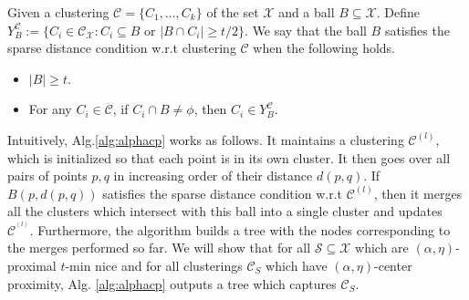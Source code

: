 \documentclass[anon,12pt]{colt2016} %
\newcommand{\mc}{\mathcal}
\begin{document}
\begin{definition}
	 Given a clustering $\mc C = \{C_1,\ldots,C_k\}$ of the set $\mc X$ and a ball $B \subseteq \mc X$. Define $Y_B^{\mc C} := \{C_i \in \mc C_{\mc X} : C_i \subseteq B \text{ or } |B \cap C_i| \ge t/2\}$. 
We say that the ball $B$ satisfies the sparse distance condition w.r.t clustering $\mc C$ when the following holds.
\begin{itemize}[noitemsep, leftmargin=*]
\item $|B| \ge t$.
\item For any $C_i \in \mc C$, if $C_i \cap B \neq \phi$, then $C_i \in Y_B^{\mc C}$.
\end{itemize}
\end{definition}

Intuitively, Alg.\ref{alg:alphacp} works as follows. It maintains a clustering $\mc C^{(l)}$, which is initialized so that each point is in its own cluster. It then goes over all pairs of points $p, q$ in increasing order of their distance $d(p, q)$. If $B(p, d(p,q))$ satisfies the sparse distance condition w.r.t $\mc C^{(l)}$, then it merges all the clusters which intersect with this ball into a single cluster and updates $\mc C^{^(l)}$. Furthermore, the algorithm builds a tree with the nodes corresponding to the merges performed so far. We will show that for all $\mc S \subseteq \mc X$ which are $(\alpha, \eta)$-proximal $t$-min nice and for all clusterings $\mc C_S$ which have $(\alpha, \eta)$-center proximity, Alg. \ref{alg:alphacp} outputs a tree which captures $\mc C_S$. %
\end{document}
